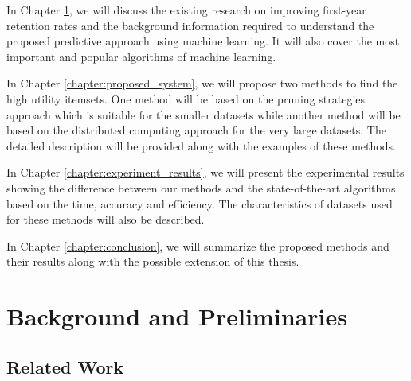 \documentclass[11pt,openright]{report}
\begin{document}
\noindent In Chapter \ref{chapter:background}, we will discuss the existing research on improving first-year retention rates and the background information required to understand the proposed predictive approach using machine learning. It will also cover the most important and popular algorithms of machine learning.
\newline

\noindent In Chapter \ref{chapter:proposed_system}, we will propose two methods to find the high utility itemsets. One method will be based on the pruning strategies approach which is suitable for the smaller datasets while another method will be based on the distributed computing approach for the very large datasets. The detailed description will be provided along with the examples of these methods.
\newline

\noindent In Chapter \ref{chapter:experiment_results}, we will present the experimental results showing the difference between our methods and the state-of-the-art algorithms based on the time, accuracy and efficiency. The characteristics of datasets used for these methods will also be described.
\newline

\noindent In Chapter \ref{chapter:conclusion}, we will summarize the proposed methods and their results along with the possible extension of this thesis.

\chapter{Background and Preliminaries} \label{chapter:background}
\section{Related Work}\label{section:relatedwork}
\end{document}
